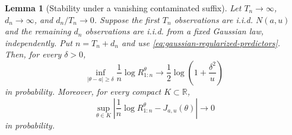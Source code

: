 \documentclass[12pt]{article}
\theoremstyle{spaced}
\newtheorem{lemma}[lemma]{Lemma}
\theoremstyle{remark}
\begin{document}
\begin{lemma}[Stability under a vanishing contaminated suffix]
\label{lem:UI-cross-stability}
Let $T_n\to\infty$, $d_n\to\infty$, and $d_n/T_n\to0$.  Suppose the first
$T_n$ observations are i.i.d. $N(a,u)$ and the remaining $d_n$ observations
are i.i.d. from a fixed Gaussian law, independently.  Put $n=T_n+d_n$ and
use \eqref{eq:gaussian-regularized-predictors}.  Then, for every $\delta>0$,
\begin{equation}
\label{eq:UI-cross-outside}
  \inf_{|\theta-a|\ge\delta}
  \frac1n\log R_{1:n}^{\theta}
  \longrightarrow
  \frac12\log\left(1+\frac{\delta^2}{u}\right)
\end{equation}
in probability.  Moreover, for every compact $K\subset\mathbb R$,
\begin{equation}
\label{eq:UI-cross-compact}
  \sup_{\theta\in K}
  \left|
    \frac1n\log R_{1:n}^{\theta}-J_{a,u}(\theta)
  \right|
  \longrightarrow0
\end{equation}
in probability.
\end{lemma}
\end{document}
